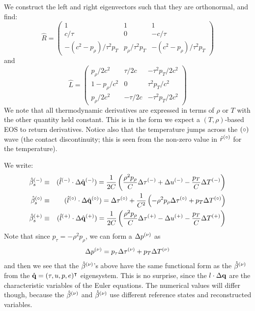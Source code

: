 We construct the left and right eigenvectors such that they are orthonormal,
and find:
\begin{equation}
\renewcommand{\arraystretch}{1.3}
\hat{R} = \left ( \begin{array}{ccc}
     1                       & 1                 & 1 \\
   c/\tau                    & 0                 & -c/\tau \\
  -(c^2 - p_\rho)/\tau^2 p_T & p_\rho/\tau^2 p_T & -(c^2 - p_\rho)/\tau^2 p_T
  \end{array} \right )
\end{equation}
and
\begin{equation}
\hat{L} = \left ( \begin{array}{ccc}
      {p_\rho}/{2 c^2}   & {\tau}/{2c}  & -{\tau^2 p_T}/{2 c^2} \\
      1 - {p_\rho}/{c^2} &0             & {\tau^2 p_T}/{c^2} \\
      {p_\rho}/{2 c^2}   & -{\tau}/{2c} & -{\tau^2 p_T}/{2 c^2} \end{array} \right )
\end{equation}
We note that all
thermodynamic derivatives are expressed in terms of $\rho$ or $T$ with
the other quantity held constant.  This is in the form we expect a
$(T, \rho)$-based EOS to return derivatives.  Notice also that the
temperature jumps across the ${(\circ)}$ wave (the contact discontinuity;
this is seen from the non-zero value in $\hat{r}^{(\circ)}$ for the
temperature).

We write:
\begin{eqnarray}
\hat{\beta}^\evm_s &\equiv& (\hat{l}^\evm \cdot \Delta \hat{\qb}^\evm ) =
   \frac{1}{2C} \left (\frac{\rho^2 p_\rho}{C} \Delta \tau^\evm
                        + \Delta u^\evm - \frac{p_T}{C}\Delta T^\evm \right ) \\
%
\hat{\beta}^\evz_s &\equiv& (\hat{l}^\evz \cdot \Delta \hat{\qb}^\evz ) =
    \Delta \tau^\evz +
        \frac{1}{C^2} \left (-\rho^2 p_\rho \Delta \tau^\evz
                        + {p_T}\Delta T^\evz \right ) \\
%
\hat{\beta}^\evp_s &\equiv& (\hat{l}^\evp \cdot \Delta \hat{\qb}^\evp ) =
   \frac{1}{2C} \left (\frac{\rho^2 p_\rho}{C} \Delta \tau^\evp
                        - \Delta u^\evp - \frac{p_T}{C}\Delta T^\evp \right )
\end{eqnarray}
Note that since $p_\tau = -\rho^2 p_\rho$, we can form a $\Delta p^{(\nu)}$ as
\begin{equation}
\Delta p^{(\nu)} = p_\tau \Delta \tau^{(\nu)} + p_T \Delta T^{(\nu)}
\end{equation}
and then we see that the $\hat{\beta}^{(\nu)}$'s above have the same
functional form as the $\mathring{\beta}^{(\nu)}$ from the $\mathring{{\bf q}}
= (\tau, u, p, e)^\intercal$ eigensystem.  This is no surprise, since
the $l\cdot \Delta {\bf q}$ are the characteristic variables of the Euler
equations.  The numerical values will differ though, because the
$\hat{\beta}^{(\nu)}$ and $\mathring{\beta}^{(\nu)}$ use different reference
states and reconstructed variables.

